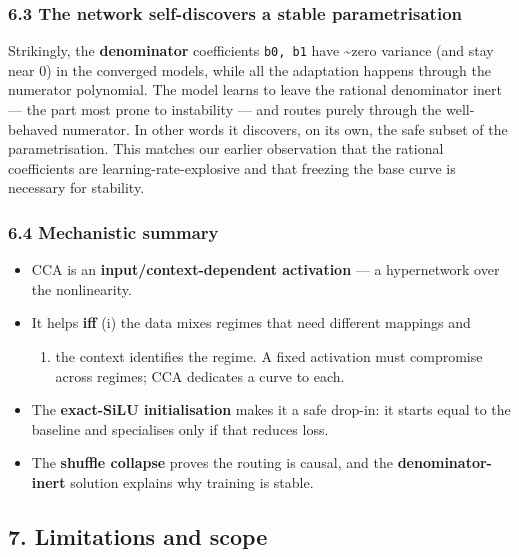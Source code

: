\documentclass[
  11pt,
]{article}
\providecommand{\tightlist}{%
  \setlength{\itemsep}{0pt}\setlength{\parskip}{0pt}}
\begin{document}
\subsubsection{6.3 The network self-discovers a stable
parametrisation}\label{the-network-self-discovers-a-stable-parametrisation}

Strikingly, the \textbf{denominator} coefficients \texttt{b0,\ b1} have
\textasciitilde zero variance (and stay near 0) in the converged models,
while all the adaptation happens through the numerator polynomial. The
model learns to leave the rational denominator inert --- the part most
prone to instability --- and routes purely through the well-behaved
numerator. In other words it discovers, on its own, the safe subset of
the parametrisation. This matches our earlier observation that the
rational coefficients are learning-rate-explosive and that freezing the
base curve is necessary for stability.

\subsubsection{6.4 Mechanistic summary}\label{mechanistic-summary}

\begin{itemize}
\tightlist
\item
  CCA is an \textbf{input/context-dependent activation} --- a
  hypernetwork over the nonlinearity.
\item
  It helps \textbf{iff} (i) the data mixes regimes that need different
  mappings and

  \begin{enumerate}
  \def\labelenumi{(\roman{enumi})}
  \setcounter{enumi}{1}
  \tightlist
  \item
    the context identifies the regime. A fixed activation must
    compromise across regimes; CCA dedicates a curve to each.
  \end{enumerate}
\item
  The \textbf{exact-SiLU initialisation} makes it a safe drop-in: it
  starts equal to the baseline and specialises only if that reduces
  loss.
\item
  The \textbf{shuffle collapse} proves the routing is causal, and the
  \textbf{denominator-inert} solution explains why training is stable.
\end{itemize}

\subsection{7. Limitations and scope}\label{limitations-and-scope}
\end{document}
